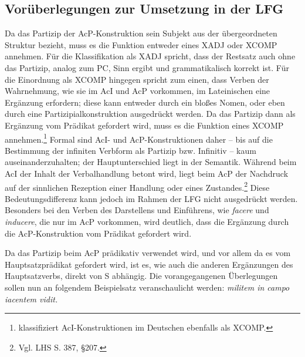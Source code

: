 \documentclass[12pt,a4paper]{article}
\begin{document}



\subsection{Vorüberlegungen zur Umsetzung in der LFG}
Da das Partizip der AcP-Konstruktion sein Subjekt aus der übergeordneten Struktur bezieht, muss es die Funktion entweder eines XADJ oder XCOMP annehmen. Für die Klassifikation als XADJ spricht, dass der Restsatz auch ohne das Partizip, analog zum PC, Sinn ergibt und grammatikalisch korrekt ist. Für die Einordnung als XCOMP hingegen spricht zum einen, dass Verben der Wahrnehmung, wie sie im AcI und AcP vorkommen, im Lateinischen eine Ergänzung erfordern; diese kann entweder durch ein bloßes Nomen, oder eben durch eine Partizipialkonstruktion ausgedrückt werden. Da das Partizip dann als Ergänzung vom Prädikat gefordert wird, muss es die Funktion eines XCOMP annehmen.\footnote{\cite[53]{Skript} klassifiziert AcI-Konstruktionen im Deutschen ebenfalls als XCOMP.} Formal sind AcI- und AcP-Konstruktionen daher -- bis auf die Bestimmung der infiniten Verbform als Partizip bzw. Infinitiv -- kaum auseinanderzuhalten; der Hauptunterschied liegt in der Semantik. Während beim AcI der Inhalt der Verbalhandlung betont wird, liegt beim AcP der Nachdruck auf der sinnlichen Rezeption einer Handlung oder eines Zustandes.\footnote{Vgl. LHS S. 387, §207.} Diese Bedeutungsdifferenz kann jedoch im Rahmen der LFG nicht ausgedrückt werden. Besonders bei den Verben des Darstellens und Einführens, wie \textit{facere} und \textit{inducere}, die nur im AcP vorkommen, wird deutlich, dass die Ergänzung durch die AcP-Konstruktion vom Prädikat gefordert wird.

Da das Partizip beim AcP prädikativ verwendet wird, und vor allem da es vom Hauptsatzprädikat gefordert wird, ist es, wie auch die anderen Ergänzungen des Hauptsatzverbs, direkt von S abhängig. Die vorangegangenen Überlegungen sollen nun an folgendem Beispielsatz veranschaulicht werden: \textit{militem in campo iacentem vidit.}
\end{document}

